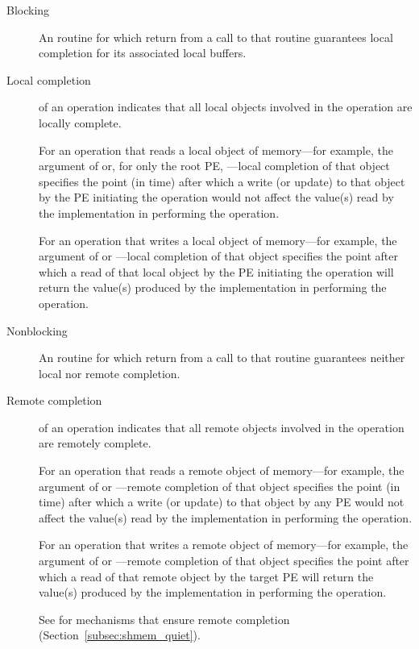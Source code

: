 \begin{description}

\item[Blocking] An \openshmem routine for which return from a call to
  that routine guarantees local completion for its associated local
  buffers.

\item[Local completion] of an \openshmem operation indicates that all
  local objects involved in the operation are locally complete.

  For an \openshmem operation that reads a local object of
  memory---for example, the \source{} argument of 
  or, for only the root \ac{PE}, ---local
  completion of that object specifies the point (in time) after which
  a write (or update) to that object by the \ac{PE} initiating the
  operation would not affect the value(s) read by the \openshmem
  implementation in performing the operation.

  For an \openshmem operation that writes a local object of
  memory---for example, the \dest{} argument of  or
  ---local completion of that object
  specifies the point after which a read of that local object by the
  \ac{PE} initiating the operation will return the value(s) produced
  by the \openshmem implementation in performing the operation.

\item[Nonblocking] An \openshmem routine for which return from a call
  to that routine guarantees neither local nor remote completion.

\item[Remote completion] of an \openshmem operation indicates that all
  remote objects involved in the operation are remotely complete.

  For an \openshmem operation that reads a remote object of
  memory---for example, the \source{} argument of  or
  ---remote completion of that object
  specifies the point (in time) after which a write (or update) to
  that object by any \ac{PE} would not affect the value(s) read by the
  \openshmem implementation in performing the operation.

  For an \openshmem operation that writes a remote object of
  memory---for example, the \dest{} argument of  or
  ---remote completion of that object
  specifies the point after which a read of that remote object by the
  target \ac{PE} will return the value(s) produced by the \openshmem
  implementation in performing the operation.

  See  for mechanisms that ensure remote completion
  (Section~\ref{subsec:shmem_quiet}).

\end{description}
